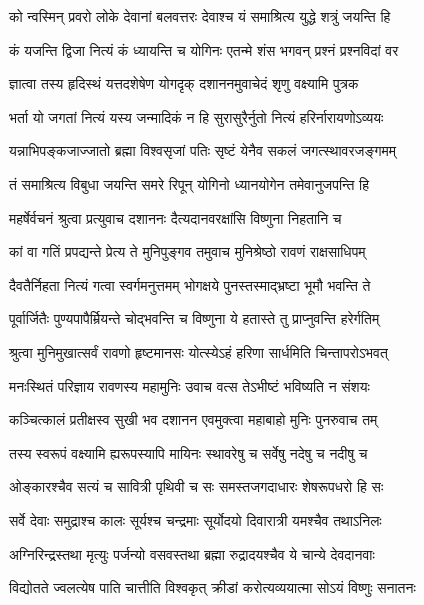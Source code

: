 \twolineshloka
{को न्वस्मिन् प्रवरो लोके देवानां बलवत्तरः}
{देवाश्च यं समाश्रित्य युद्धे शत्रुं जयन्ति हि} %

\twolineshloka
{कं यजन्ति द्विजा नित्यं कं ध्यायन्ति च योगिनः}
{एतन्मे शंस भगवन् प्रश्नं प्रश्नविदां वर} %

\twolineshloka
{ज्ञात्वा तस्य हृदिस्थं यत्तदशेषेण योगदृक्}
{दशाननमुवाचेदं शृणु वक्ष्यामि पुत्रक} %

\twolineshloka
{भर्ता यो जगतां नित्यं यस्य जन्मादिकं न हि}
{सुरासुरैर्नुतो नित्यं हरिर्नारायणोऽव्ययः} %

\twolineshloka
{यन्नाभिपङ्कजाज्जातो ब्रह्मा विश्वसृजां पतिः}
{सृष्टं येनैव सकलं जगत्स्थावरजङ्गमम्} %

\twolineshloka
{तं समाश्रित्य विबुधा जयन्ति समरे रिपून्}
{योगिनो ध्यानयोगेन तमेवानुजपन्ति हि} %

\twolineshloka
{महर्षेर्वचनं श्रुत्वा प्रत्युवाच दशाननः}
{दैत्यदानवरक्षांसि विष्णुना निहतानि च} %

\twolineshloka
{कां वा गतिं प्रपद्यन्ते प्रेत्य ते मुनिपुङ्गव}
{तमुवाच मुनिश्रेष्ठो रावणं राक्षसाधिपम्} %

\twolineshloka
{दैवतैर्निहता नित्यं गत्वा स्वर्गमनुत्तमम्}
{भोगक्षये पुनस्तस्माद्भ्रष्टा भूमौ भवन्ति ते} %

\twolineshloka
{पूर्वार्जितैः पुण्यपापैर्म्रियन्ते चोद्भवन्ति च}
{विष्णुना ये हतास्ते तु प्राप्नुवन्ति हरेर्गतिम्} %

\twolineshloka
{श्रुत्वा मुनिमुखात्सर्वं रावणो हृष्टमानसः}
{योत्स्येऽहं हरिणा सार्धमिति चिन्तापरोऽभवत्} %

\twolineshloka
{मनःस्थितं परिज्ञाय रावणस्य महामुनिः}
{उवाच वत्स तेऽभीष्टं भविष्यति न संशयः} %

\twolineshloka
{कञ्चित्कालं प्रतीक्षस्व सुखी भव दशानन}
{एवमुक्त्वा महाबाहो मुनिः पुनरुवाच तम्} %

\twolineshloka
{तस्य स्वरूपं वक्ष्यामि ह्यरूपस्यापि मायिनः}
{स्थावरेषु च सर्वेषु नदेषु च नदीषु च} %

\twolineshloka
{ओङ्कारश्चैव सत्यं च सावित्री पृथिवी च सः}
{समस्तजगदाधारः शेषरूपधरो हि सः} %

\twolineshloka
{सर्वे देवाः समुद्राश्च कालः सूर्यश्च चन्द्रमाः}
{सूर्योदयो दिवारात्री यमश्चैव तथाऽनिलः} %

\twolineshloka
{अग्निरिन्द्रस्तथा मृत्युः पर्जन्यो वसवस्तथा}
{ब्रह्मा रुद्रादयश्चैव ये चान्ये देवदानवाः} %

\twolineshloka
{विद्योतते ज्वलत्येष पाति चात्तीति विश्वकृत्}
{क्रीडां करोत्यव्ययात्मा सोऽयं विष्णुः सनातनः} %

